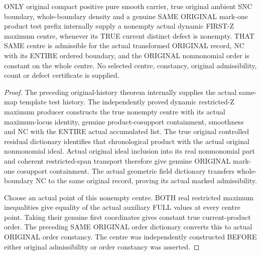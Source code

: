 \begin{theorem}
\label{hir:sharp-actual-dynamic-first-defect-original-admissible-centre}
\leanok
ONLY original compact positive pure smooth carrier, true original ambient
SNC boundary, whole-boundary density and a genuine SAME ORIGINAL mark-one
product test prefix internally supply a nonempty actual dynamic FIRST-Z
maximum centre, whenever its TRUE current distinct defect is nonempty.
THAT SAME centre is admissible for the actual transformed ORIGINAL record,
NC with its ENTIRE ordered boundary, and the ORIGINAL nonmonomial order is
constant on the whole centre. No selected centre, constancy, original
admissibility, count or defect certificate is supplied.
\end{theorem}
\begin{proof}
The preceding original-history theorem internally supplies the actual
same-map template test history. The independently proved dynamic
restricted-Z maximum producer constructs the true nonempty centre with
its actual maximum-locus identity, genuine product-cosupport containment,
smoothness and NC with the ENTIRE actual accumulated list. The true
original controlled residual dictionary identifies that chronological
product with the actual original nonmonomial ideal. Actual original ideal
inclusion into its real nonmonomial part and coherent restricted-span
transport therefore give genuine ORIGINAL mark-one cosupport containment.
The actual geometric field dictionary transfers whole-boundary NC to the
same original record, proving its actual marked admissibility.

Choose an actual point of this nonempty centre. BOTH real restricted
maximum inequalities give equality of the actual auxiliary FULL values
at every centre point. Taking their genuine first coordinates gives
constant true current-product order. The preceding SAME ORIGINAL order
dictionary converts this to actual ORIGINAL order constancy. The centre
was independently constructed BEFORE either original admissibility or
order constancy was asserted.
\end{proof}


